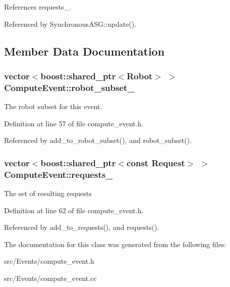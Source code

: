 References requests\_\-.

Referenced by SynchronousASG::update().

\subsection{Member Data Documentation}
\hypertarget{class_compute_event_2dbee5c3df3a079df940e2992b0afc30}{
\subsubsection[robot\_\-subset\_\-]{\setlength{\rightskip}{0pt plus 5cm}vector$<$boost::shared\_\-ptr$<$Robot$>$ $>$ {\bf ComputeEvent::robot\_\-subset\_\-}}}
\label{class_compute_event_2dbee5c3df3a079df940e2992b0afc30}


The robot subset for this event. 

Definition at line 57 of file compute\_\-event.h.

Referenced by add\_\-to\_\-robot\_\-subset(), and robot\_\-subset().\hypertarget{class_compute_event_31c8515c8d6eeddecf1111fc8fd0ba67}{
\subsubsection[requests\_\-]{\setlength{\rightskip}{0pt plus 5cm}vector$<$boost::shared\_\-ptr$<$const {\bf Request}$>$ $>$ {\bf ComputeEvent::requests\_\-}}}
\label{class_compute_event_31c8515c8d6eeddecf1111fc8fd0ba67}


The set of resulting requests 

Definition at line 62 of file compute\_\-event.h.

Referenced by add\_\-to\_\-requests(), and requests().

The documentation for this class was generated from the following files:\begin{CompactItemize}
\item 
src/Events/compute\_\-event.h\item 
src/Events/compute\_\-event.cc\end{CompactItemize}
